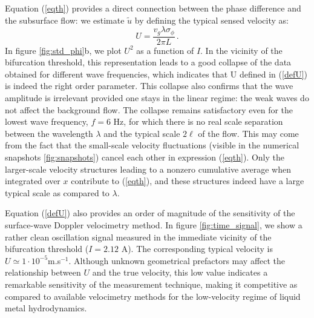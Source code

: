 \documentclass[doublecol]{epl2} %
\begin{document}
Equation (\ref{eqth}) provides a direct connection between the phase difference and the subsurface flow: we estimate $\tilde{u}$ by defining the typical sensed velocity as:
\begin{equation}
U=\frac{v_g \lambda \sigma_\phi}{2 \pi L} \, . \label{defU}
\end{equation}
In figure \ref{fig:std_phi}b, we plot $U^2$ as a function of $I$. In the vicinity of the bifurcation threshold, this representation leads to a good collapse of the data obtained for different wave frequencies, which indicates that U defined in (\ref{defU}) is indeed the right order parameter. This collapse also confirms that the wave amplitude is irrelevant provided one stays in the linear regime: the weak waves do not affect the background flow. The collapse remains satisfactory even for the lowest wave frequency, $f=6$ Hz, for which there is no real scale separation between the wavelength $\lambda$ and the typical scale $2 \ell$ of the flow. This may come from the fact that the small-scale velocity fluctuations (visible in the numerical snapshots \ref{fig:snapshots}) cancel each other in expression (\ref{eqth}). Only the larger-scale velocity structures leading to a nonzero cumulative average when integrated over $x$ contribute to (\ref{eqth}), and these structures indeed have a large typical scale as compared to $\lambda$.

Equation (\ref{defU}) also provides an order of magnitude of the sensitivity of the surface-wave Doppler velocimetry method. In figure \ref{fig:time_signal}, we show a rather clean oscillation signal measured in the immediate vicinity of the bifurcation threshold ($I=2.12$ A). The corresponding typical velocity is $U \simeq 1 \cdot 10^{-5}$m.s$^{-1}$. Although unknown geometrical prefactors may affect the relationship between $U$ and the true velocity, this low value indicates a remarkable sensitivity of the measurement technique, making it competitive as compared to available velocimetry methods for the low-velocity regime of liquid metal hydrodynamics.
\end{document}
